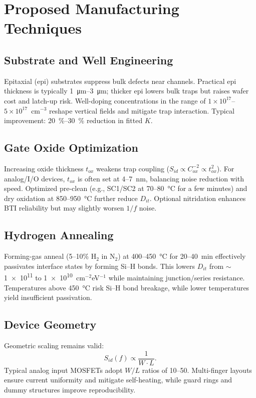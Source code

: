 \documentclass[conference]{IEEEtran}
\begin{document}
\section{Proposed Manufacturing Techniques}

\subsection{Substrate and Well Engineering}
Epitaxial (epi) substrates suppress bulk defects near channels. 
Practical epi thickness is typically \SIrange{1}{3}{\um}; thicker epi lowers bulk traps but raises wafer cost and latch-up risk. 
Well-doping concentrations in the range of $1\times10^{17}$--$5\times10^{17}$~cm$^{-3}$ reshape vertical fields and mitigate trap interaction. 
Typical improvement: \SI{20}{\percent}--\SI{30}{\percent} reduction in fitted $K$.

\subsection{Gate Oxide Optimization}
Increasing oxide thickness $t_{ox}$ weakens trap coupling 
($S_{id}\!\propto\! C_{ox}^{-2}\!\propto\! t_{ox}^{2}$). 
For analog/I/O devices, $t_{ox}$ is often set at 4--7~nm, balancing noise reduction with speed. 
Optimized pre-clean (e.g., SC1/SC2 at 70--80~\si{\celsius} for a few minutes) and dry oxidation at 850--950~\si{\celsius} further reduce $D_{it}$. 
Optional nitridation enhances BTI reliability but may slightly worsen $1/f$ noise.

\subsection{Hydrogen Annealing}
Forming-gas anneal (5--10\% H$_2$ in N$_2$) at 400--450~\si{\celsius} for 20--40~min effectively passivates interface states by forming Si--H bonds. 
This lowers $D_{it}$ from $\sim$\num{1e11} to \num{1e10}~cm$^{-2}$eV$^{-1}$ while maintaining junction/series resistance. 
Temperatures above 450~\si{\celsius} risk Si--H bond breakage, while lower temperatures yield insufficient passivation.

\subsection{Device Geometry}
Geometric scaling remains valid:
\begin{equation}
  S_{id}(f) \propto \frac{1}{W\cdot L}.
\end{equation}
Typical analog input MOSFETs adopt $W/L$ ratios of 10--50. 
Multi-finger layouts ensure current uniformity and mitigate self-heating, while guard rings and dummy structures improve reproducibility.
\end{document}
